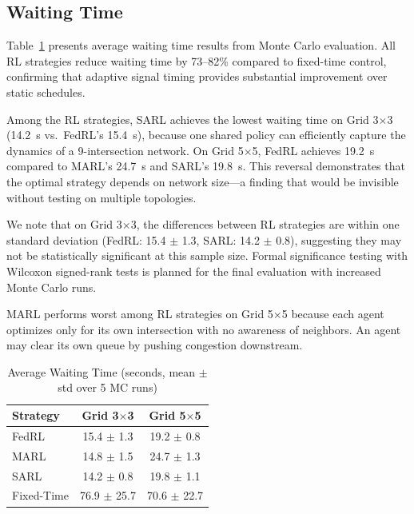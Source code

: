 \documentclass[conference]{IEEEtran}
\begin{document}
\subsection{Waiting Time}

Table~\ref{tab:waiting_time} presents average waiting time results from Monte Carlo evaluation. All RL strategies reduce waiting time by 73--82\% compared to fixed-time control, confirming that adaptive signal timing provides substantial improvement over static schedules.

Among the RL strategies, SARL achieves the lowest waiting time on Grid 3$\times$3 (14.2~s vs.\ FedRL's 15.4~s), because one shared policy can efficiently capture the dynamics of a 9-intersection network. On Grid 5$\times$5, FedRL achieves 19.2~s compared to MARL's 24.7~s and SARL's 19.8~s. This reversal demonstrates that the optimal strategy depends on network size---a finding that would be invisible without testing on multiple topologies.

We note that on Grid 3$\times$3, the differences between RL strategies are within one standard deviation (FedRL: 15.4 $\pm$ 1.3, SARL: 14.2 $\pm$ 0.8), suggesting they may not be statistically significant at this sample size. Formal significance testing with Wilcoxon signed-rank tests is planned for the final evaluation with increased Monte Carlo runs.

MARL performs worst among RL strategies on Grid 5$\times$5 because each agent optimizes only for its own intersection with no awareness of neighbors. An agent may clear its own queue by pushing congestion downstream.

\begin{table}[htbp]
\caption{Average Waiting Time (seconds, mean $\pm$ std over 5 MC runs)}
\begin{center}
\begin{tabular}{lcc}
\toprule
\textbf{Strategy} & \textbf{Grid 3$\times$3} & \textbf{Grid 5$\times$5} \\
\midrule
FedRL & 15.4 $\pm$ 1.3 & 19.2 $\pm$ 0.8 \\
MARL & 14.8 $\pm$ 1.5 & 24.7 $\pm$ 1.3 \\
SARL & 14.2 $\pm$ 0.8 & 19.8 $\pm$ 1.1 \\
Fixed-Time & 76.9 $\pm$ 25.7 & 70.6 $\pm$ 22.7 \\
\bottomrule
\end{tabular}
\label{tab:waiting_time}
\end{center}
\end{table}
\end{document}

